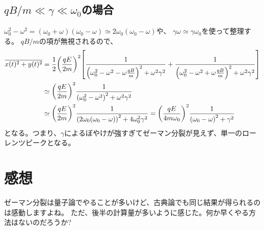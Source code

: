 \documentclass[../ap_2011.tex]{subfiles}
\begin{document}
\subsection*{\(qB/m\ll\gamma \ll  \omega_0\)の場合}
\(\omega_0^2-\omega^2=(\omega_0+\omega)(\omega_0-\omega)\simeq 2\omega_0(\omega_0-\omega)\)や、
\(\gamma\omega\simeq\gamma\omega_0\)を使って整理する。
\(qB/m\)の項が無視されるので、
\begin{equation}\begin{aligned}[b]
    \overline{x(t)^2+y(t)^2}
    &=\frac{1}{2}\qty(\frac{qE}{2m})^2\qty[\frac{1}{\qty(\omega_0^2-\omega^2-\omega\frac{qB}{m})^2+\omega^2\gamma^2}
    +\frac{1}{\qty(\omega_0^2-\omega^2+\omega\frac{qB}{m})^2+\omega^2\gamma^2}]\\
    &\simeq \qty(\frac{qE}{2m})^2\frac{1}{\qty(\omega_0^2-\omega^2)^2+\omega^2\gamma^2}\\
    &\simeq \qty(\frac{qE}{2m})^2\frac{1}{\qty(2\omega_0(\omega_0-\omega))^2+4\omega_0^2\gamma^2}
    = \qty(\frac{qE}{4m\omega_0})^2\frac{1}{\qty(\omega_0-\omega)^2+\gamma^2}
\end{aligned}\end{equation}
となる。つまり、\(\gamma\)によるぼやけが強すぎてゼーマン分裂が見えず、単一のローレンツピークとなる。

\section*{感想}
ゼーマン分裂は量子論でやることが多いけど、古典論でも同じ結果が得られるのは感動しますよね。
ただ、後半の計算量が多いように感じた。何か早くやる方法はないのだろうか?
\end{document}
